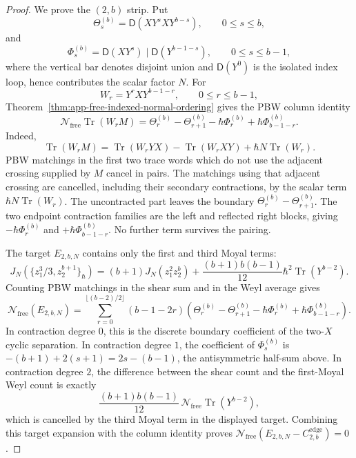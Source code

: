 \begin{proof}
  We prove the \((2,b)\) strip.  Put
  \[
    \Theta_s^{(b)}=\mathsf D(XY^sXY^{b-s}),
    \qquad 0\leq s\leq b,
  \]
  and
  \[
    \Phi_s^{(b)}
    =
    \mathsf D(XY^s)\mid\mathsf D(Y^{b-1-s}),
    \qquad 0\leq s\leq b-1,
  \]
  where the vertical bar denotes disjoint union and
  \(\mathsf D(Y^0)\) is the isolated index loop, hence contributes the
  scalar factor \(N\).  For
  \[
    W_r=Y^rXY^{b-1-r},\qquad 0\leq r\leq b-1,
  \]
  Theorem~\ref{thm:app-free-indexed-normal-ordering} gives the PBW
  column identity
  \[
    \mathcal N_{\mathrm{free}}\operatorname{Tr}(W_rM)
    =
    \Theta_r^{(b)}-\Theta_{r+1}^{(b)}
    -\hbar\Phi_r^{(b)}
    +\hbar\Phi_{b-1-r}^{(b)}.
  \]
  Indeed,
  \[
    \operatorname{Tr}(W_rM)
    =
    \operatorname{Tr}(W_rYX)
    -\operatorname{Tr}(W_rXY)
    +\hbar N\operatorname{Tr}(W_r).
  \]
  PBW matchings in the first two trace words which do not use the
  adjacent crossing supplied by \(M\) cancel in pairs.  The matchings
  using that adjacent crossing are cancelled, including their secondary
  contractions, by the scalar term \(\hbar N\operatorname{Tr}(W_r)\).
  The uncontracted part leaves the boundary
  \(\Theta_r^{(b)}-\Theta_{r+1}^{(b)}\).  The two endpoint contraction
  families are the left and reflected right blocks, giving
  \(-\hbar\Phi_r^{(b)}\) and \(+\hbar\Phi_{b-1-r}^{(b)}\).  No further
  term survives the pairing.

  The target \(E_{2,b,N}\) contains only the first and third Moyal
  terms:
  \[
    J_N\!\left(
      \{z_1^3/3,z_2^{b+1}\}_\hbar
    \right)
    =
    (b+1)J_N(z_1^2z_2^b)
    +\frac{(b+1)b(b-1)}{12}\hbar^2\operatorname{Tr}(Y^{b-2}).
  \]
  Counting PBW matchings in the shear sum and in the Weyl average gives
  \[
    \mathcal N_{\mathrm{free}}(E_{2,b,N})
    =
    \sum_{r=0}^{\lfloor(b-2)/2\rfloor}
      (b-1-2r)
      \left(
        \Theta_r^{(b)}-\Theta_{r+1}^{(b)}
        -\hbar\Phi_r^{(b)}
        +\hbar\Phi_{b-1-r}^{(b)}
      \right).
  \]
  In contraction degree \(0\), this is the discrete boundary coefficient
  of the two-\(X\) cyclic separation.  In contraction degree \(1\), the
  coefficient of \(\Phi_s^{(b)}\) is
  \(-(b+1)+2(s+1)=2s-(b-1)\), the antisymmetric half-sum above.  In
  contraction degree \(2\), the difference between the shear count and
  the first-Moyal Weyl count is exactly
  \[
    \frac{(b+1)b(b-1)}{12}\,
    \mathcal N_{\mathrm{free}}\operatorname{Tr}(Y^{b-2}),
  \]
  which is cancelled by the third Moyal term in the displayed target.
  Combining this target expansion with the column identity proves
  \(\mathcal N_{\mathrm{free}}(E_{2,b,N}-C^{\mathrm{edge}}_{2,b})=0\).


\end{proof}

